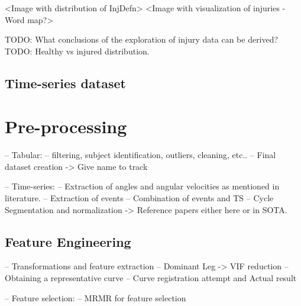 <Image with distribution of InjDefn> 
<Image with visualization of injuries - Word map?> 


TODO: What conclusions of the exploration of injury data can be derived?
TODO: Healthy vs injured distribution.


\subsection{Time-series dataset}\label{subsec:method-ts-dataset}









\section{Pre-processing}\label{sec:method-preprocessing}
-- Tabular:
    -- filtering, subject identification, outliers, cleaning, etc..
    -- Final dataset creation -> Give name to track

-- Time-series:
    -- Extraction of angles and angular velocities as mentioned in literature.
    -- Extraction of events
    -- Combination of events and TS
    -- Cycle Segmentation and normalization -> Reference papers either here or in SOTA.

\subsection{Feature Engineering}\label{subsec:method-feature-engineering}
-- Transformations and feature extraction
    -- Dominant Leg -> VIF reduction
    -- Obtaining a representative curve
        -- Curve registration attempt and Actual result

-- Feature selection:
    -- MRMR for feature selection

